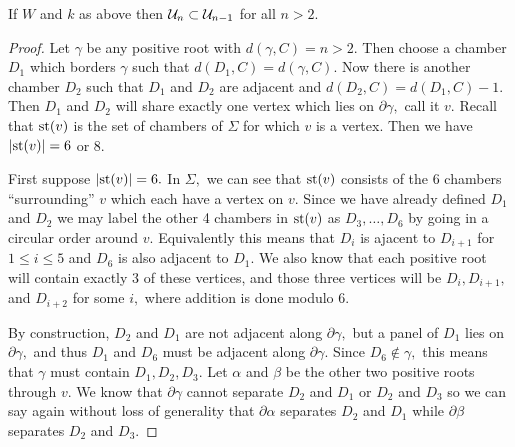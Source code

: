 \documentclass[class=book, crop=false]{standalone}
\begin{document}
\begin{theorem}
	\label{334f2fg}
	If $W$ and $k$ as above then $\mathcal{U}_n\subset \mathcal{U}_{n-1}$ for all $n>2.$
\end{theorem}
\begin{proof}
	Let $\gamma$ be any positive root with $d(\gamma,C)=n>2.$ Then choose a chamber $D_1$ which borders $\gamma$ such that $d(D_1,C)=d(\gamma,C).$ Now there is another chamber $D_2$ such that $D_1$ and $D_2$ are adjacent and $d(D_2,C)=d(D_1,C)-1.$ Then $D_1$ and $D_2$ will share exactly one vertex which lies on $\partial \gamma,$ call it $v.$ Recall that $\mathrm{st}(v)$ is the set of chambers of $\Sigma$ for which $v$ is a vertex. Then we have $|\mathrm{st}(v)|=6$ or $8.$

	First suppose $|\mathrm{st}(v)|=6.$ In $\Sigma,$ we can see that $\mathrm{st}(v)$ consists of the 6 chambers ``surrounding'' $v$ which each have a vertex on $v.$ Since we have already defined $D_1$ and $D_2$ we may label the other 4 chambers in $\mathrm{st}(v)$ as $D_3,\dots,D_6$ by going in a circular order around $v.$ Equivalently this means that $D_i$ is ajacent to $D_{i+1}$ for $1\le i\le 5$ and $D_6$ is also adjacent to $D_1.$ We also know that each positive root will contain exactly 3 of these vertices, and those three vertices will be $D_i,D_{i+1},$ and $D_{i+2}$ for some $i,$ where addition is done modulo 6.

	By construction, $D_2$ and $D_1$ are not adjacent along $\partial \gamma,$ but a panel of $D_1$ lies on $\partial \gamma,$ and thus $D_1$ and $D_6$ must be adjacent along $\partial\gamma.$ Since $D_6\not\in \gamma,$ this means that $\gamma$ must contain $D_1,D_2,D_3.$ Let $\alpha$ and $\beta$ be the other two positive roots through $v.$ We know that $\partial\gamma$ cannot separate $D_2$ and $D_1$ or $D_2$ and $D_3$ so we can say again without loss of generality that $\partial\alpha$ separates $D_2$ and $D_1$ while $\partial\beta$ separates $D_2$ and $D_3.$ 


\end{proof}
\end{document}
